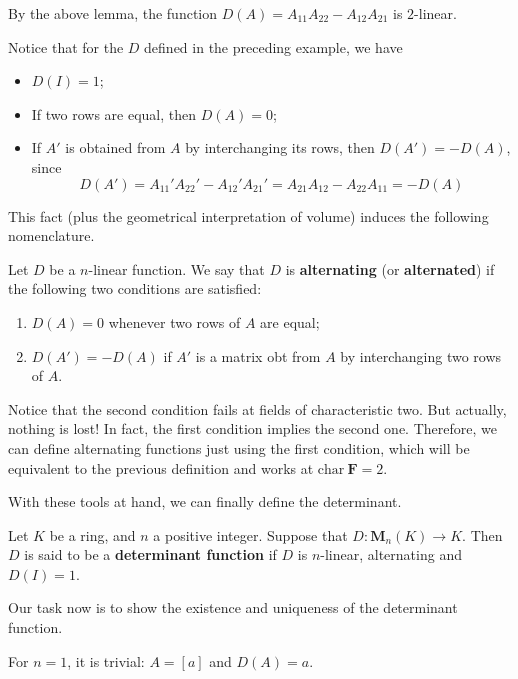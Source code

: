 \begin{example}
	By the above lemma, the function $D(A) = A_{11}A_{22} - A_{12}A_{21}$ is $2$-linear. 
\end{example}

Notice that for the $D$ defined in the preceding example, we have
\begin{itemize}
	\item $D(I) = 1$;
	\item If two rows are equal, then $D(A) = 0$; 
	\item If $A'$ is obtained from $A$ by interchanging its rows, then $D(A') = - D(A)$, since \[ D(A') = A_{11}'A_{22}' - A_{12}'A_{21}' = A_{21}A_{12} - A_{22}A_{11} = -D(A) \]
\end{itemize}

This fact (plus the geometrical interpretation of volume) induces the following nomenclature.

\begin{definition}[Alternating]
	Let $D$ be a $n$-linear function. We say that $D$ is \textbf{alternating} (or \textbf{alternated}) if the following two conditions are satisfied:
	\begin{enumerate}
		\item $D(A) = 0$ whenever two rows of $A$ are equal;
		\item $D(A') = -D(A)$ if $A'$ is a matrix obt from $A$ by interchanging two rows of $A$.
	\end{enumerate}
\end{definition}

Notice that the second condition fails at fields of characteristic two. But actually, nothing is lost! In fact, the first condition implies the second one. Therefore, we can define alternating functions just using the first condition, which will be equivalent to the previous definition and works at $\text{char} ~\textbf{F} = 2$.

With these tools at hand, we can finally define the determinant.

\begin{definition}[Determinant]
	Let $K$ be a ring, and $n$ a positive integer. Suppose that $D : \textbf{M}_n(K) \longrightarrow K$. Then $D$ is said to be a \textbf{determinant function} if $D$ is $n$-linear, alternating and $D(I) = 1$.
\end{definition}

Our task now is to show the existence and uniqueness of the determinant function.

For $n = 1$, it is trivial: $A = [a]$ and $D(A) = a$.

